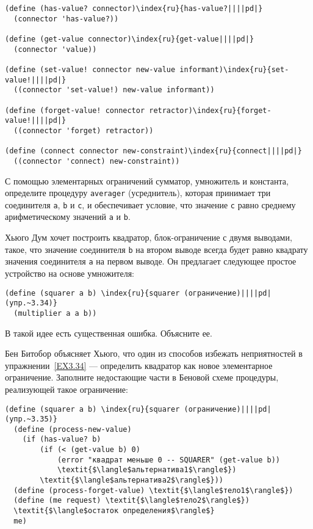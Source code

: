 \begin{Verbatim}[fontsize=\small]
(define (has-value? connector)\index{ru}{has-value?||||pd|}
  (connector 'has-value?))

(define (get-value connector)\index{ru}{get-value||||pd|}
  (connector 'value))

(define (set-value! connector new-value informant)\index{ru}{set-value!||||pd|}
  ((connector 'set-value!) new-value informant))

(define (forget-value! connector retractor)\index{ru}{forget-value!||||pd|}
  ((connector 'forget) retractor))

(define (connect connector new-constraint)\index{ru}{connect||||pd|}
  ((connector 'connect) new-constraint))
\end{Verbatim}
\begin{exercise}{3.33}\label{EX3.33}%
С помощью элементарных ограничений сумматор, умножитель
и константа, определите процедуру {\tt averager} (усреднитель),
которая принимает три соединителя {\tt a}, {\tt b} и
{\tt c}, и обеспечивает условие, что значение
{\tt c} равно среднему арифметическому значений {\tt a}
и {\tt b}.
\end{exercise}
\begin{exercise}{3.34}\label{EX3.34}%
Хьюго Дум хочет построить квадратор,
блок-ограничение с двумя выводами, такое, что значение соединителя
{\tt b} на втором выводе всегда будет равно квадрату значения
соединителя {\tt a} на первом выводе. Он предлагает следующее
простое устройство на основе умножителя:

\begin{Verbatim}[fontsize=\small]
(define (squarer a b) \index{ru}{squarer (ограничение)||||pd|(упр.~3.34)}
  (multiplier a a b))
\end{Verbatim}
В такой идее есть существенная ошибка.  Объясните ее.
\end{exercise}
\begin{exercise}{3.35}\label{EX3.35}%
Бен Битобор объясняет Хьюго, что один из способов
избежать неприятностей в упражнении~\ref{EX3.34} ---
определить квадратор как новое элементарное ограничение.  Заполните
недостающие части в Беновой схеме процедуры, реализующей такое
ограничение:

\begin{Verbatim}[fontsize=\small]
(define (squarer a b) \index{ru}{squarer (ограничение)||||pd|(упр.~3.35)}
  (define (process-new-value)
    (if (has-value? b)
        (if (< (get-value b) 0)
            (error "квадрат меньше 0 -- SQUARER" (get-value b))
            \textit{$\langle$альтернатива1$\rangle$})
        \textit{$\langle$альтернатива2$\rangle$}))
  (define (process-forget-value) \textit{$\langle$тело1$\rangle$})
  (define (me request) \textit{$\langle$тело2$\rangle$})
  \textit{$\langle$остаток определения$\rangle$}
  me)
\end{Verbatim}
\end{exercise}
